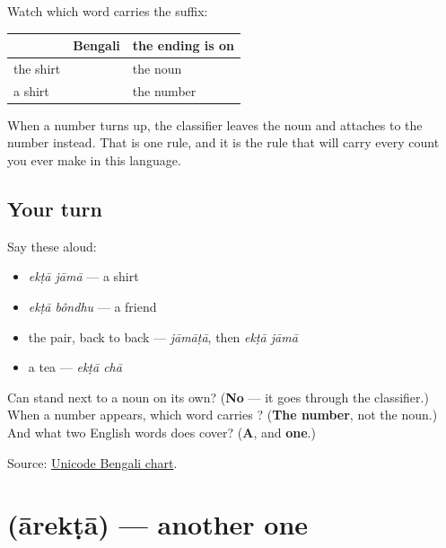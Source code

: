 \begin{grammarlens}[title={Grammar Lens: where the ending goes, and it moves}]
Watch which word carries the suffix:

\noindent
\begin{tabularx}{\linewidth}{@{}>{\raggedright\arraybackslash}X>{\raggedright\arraybackslash}X>{\raggedright\arraybackslash}X@{}}
\toprule
\textbf{} & \textbf{Bengali} & \textbf{the ending is on} \\
\midrule
the shirt & \textbf{\bn{জামাটা}} & the noun \\
a shirt & \textbf{\bn{একটা} \bn{জামা}} & the number \\
\bottomrule
\end{tabularx}

When a number turns up, the classifier leaves the noun and attaches to the number instead. That is one rule, and it is the rule that will carry every count you ever make in this language.
\end{grammarlens}

\subsection*{Your turn}
Say these aloud:

\begin{itemize}
\raggedright
  \item \emph{ekṭā jāmā} — a shirt
  \item \emph{ekṭā bôndhu} — a friend
  \item the pair, back to back — \emph{jāmāṭā}, then \emph{ekṭā jāmā}
  \item a tea — \emph{ekṭā chā}
\end{itemize}

\begin{tcolorbox}[breakable,colback=teal!4,colframe=teal!35!black,title={Before you move on}]
Can \textbf{} stand next to a noun on its own? (\textbf{No} — it goes through the classifier.) When a number appears, which word carries \textbf{}? (\textbf{The number}, not the noun.) And what two English words does \textbf{} cover? (\textbf{A}, and \textbf{one}.)

Source: \href{https://www.unicode.org/charts/PDF/U0980.pdf}{Unicode Bengali chart}.
\end{tcolorbox}
\section[\texorpdfstring{\bn{আরেকটা} (ārekṭā)}{আরেকটা (ārekṭā)}]{ (ārekṭā) — another one}


